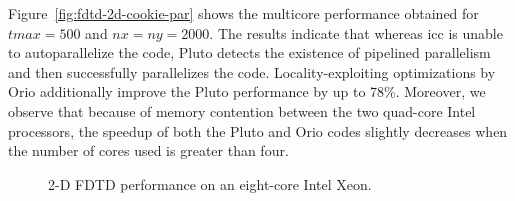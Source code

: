  
Figure~\ref{fig:fdtd-2d-cookie-par} shows the multicore performance
obtained for $tmax=500$ and $nx=ny=2000$. The results indicate that
whereas icc is unable to autoparallelize the code, Pluto detects the
existence of pipelined parallelism and then successfully parallelizes
the code. Locality-exploiting optimizations by Orio additionally
improve the Pluto performance by up to 78\%. Moreover, we observe
that because of memory contention between the two quad-core Intel
processors, the speedup of both the Pluto and Orio codes slightly
decreases when the number of cores used is greater than four.
 
\begin{figure}%
\begin{center} 
    
\end{center}
\caption{2-D FDTD performance on an eight-core Intel Xeon.} 
\label{fig:fdtd-2d-cookie-results} 
\end{figure} 


